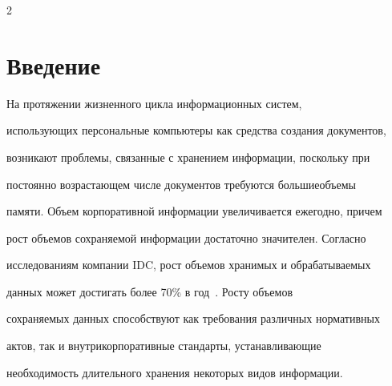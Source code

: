 \vspace*{6pt}


      












      \thispagestyle{headings}





      \begin{multicols}{2}





      \label{st\stat}





\section{Введение}





     На протяжении жизненного цикла информа\-ционных систем, 


использующих персональные компьютеры как средства создания документов, 


возникают проблемы, связанные с хранением информации, поскольку при 


постоянно возраста\-ющем числе документов требуются большие\linebreak объемы 


памяти. Объем корпоративной информации увеличивается ежегодно, причем 


рост \mbox{объемов} со\-хра\-ня\-емой информации достаточно значителен. Согласно 


исследованиям компании IDC, рост объемов хранимых и обрабатываемых 


данных может достигать более 70\% в год~\cite{11che}. Росту объемов 


со\-хра\-ня\-емых данных способствуют как требования различных нормативных 


актов, так и внутрикорпоративные стандарты, устанавливающие 


необходимость  длительного хранения некоторых видов информации. 



\end{multicols}
